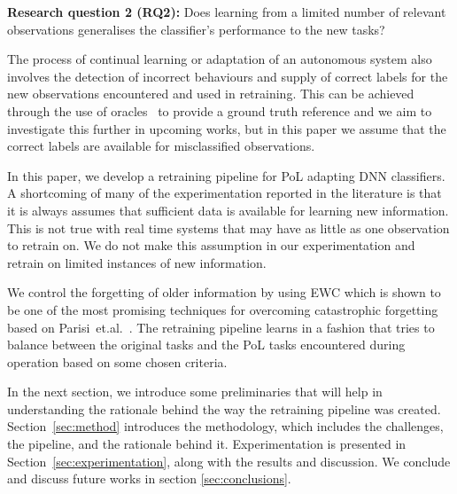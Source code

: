\textbf{Research question 2 (RQ2):} Does learning from a limited number of relevant observations generalises the classifier’s performance to the new tasks?


The process of continual learning or adaptation of an autonomous system also involves the detection of incorrect behaviours and supply of correct labels for the new observations encountered and used in retraining. 
%
This can be achieved through the use of oracles~\cite{Barr2015,Zhang2020} to provide a ground truth reference and we aim to investigate this further in upcoming works, but in this paper we assume that the correct labels are available for misclassified observations.

In this paper, we develop a retraining pipeline for PoL adapting DNN classifiers. 
%
A shortcoming of many of the experimentation reported in the literature is that it is always assumes that sufficient data is available for learning new information. 
%
This is not true with real time systems that may have as little as one observation to retrain on. We do not make this assumption in our experimentation and retrain on limited instances of new information.

We control the forgetting of older information by using EWC which is shown to be one of the most promising techniques for overcoming catastrophic forgetting based on Parisi~et.al.~\cite{Parisi2019}.
% 
The retraining pipeline learns in a fashion that tries to balance between the original tasks and the PoL tasks encountered during operation based on some chosen criteria. 

In the next section, we introduce some preliminaries that will help in understanding the rationale behind the way the retraining pipeline was created. 
%
Section~\ref{sec:method} introduces the methodology, which includes the challenges, the pipeline, and the rationale behind it.
%
Experimentation is presented in Section~\ref{sec:experimentation}, along with the results and discussion. 
%
We conclude and discuss future works in section \ref{sec:conclusions}.



